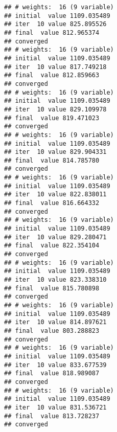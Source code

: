 \documentclass[
]{article}
\newenvironment{Shaded}{\begin{snugshade}}{\end{snugshade}}
\newcommand{\AttributeTok}[1]{\textcolor[rgb]{0.77,0.63,0.00}{#1}}
\newcommand{\CommentTok}[1]{\textcolor[rgb]{0.56,0.35,0.01}{\textit{#1}}}
\newcommand{\DecValTok}[1]{\textcolor[rgb]{0.00,0.00,0.81}{#1}}
\newcommand{\FunctionTok}[1]{\textcolor[rgb]{0.00,0.00,0.00}{#1}}
\newcommand{\NormalTok}[1]{#1}
\newcommand{\OtherTok}[1]{\textcolor[rgb]{0.56,0.35,0.01}{#1}}
\newcommand{\SpecialCharTok}[1]{\textcolor[rgb]{0.00,0.00,0.00}{#1}}
\begin{document}
\begin{Shaded}
\end{Shaded}

\begin{verbatim}
## # weights:  16 (9 variable)
## initial  value 1109.035489 
## iter  10 value 825.895526
## final  value 812.965374 
## converged
## # weights:  16 (9 variable)
## initial  value 1109.035489 
## iter  10 value 817.749218
## final  value 812.859663 
## converged
## # weights:  16 (9 variable)
## initial  value 1109.035489 
## iter  10 value 829.109978
## final  value 819.471023 
## converged
## # weights:  16 (9 variable)
## initial  value 1109.035489 
## iter  10 value 829.904331
## final  value 814.785780 
## converged
## # weights:  16 (9 variable)
## initial  value 1109.035489 
## iter  10 value 822.838011
## final  value 816.664332 
## converged
## # weights:  16 (9 variable)
## initial  value 1109.035489 
## iter  10 value 829.280471
## final  value 822.354104 
## converged
## # weights:  16 (9 variable)
## initial  value 1109.035489 
## iter  10 value 823.338310
## final  value 815.780898 
## converged
## # weights:  16 (9 variable)
## initial  value 1109.035489 
## iter  10 value 814.897621
## final  value 803.288823 
## converged
## # weights:  16 (9 variable)
## initial  value 1109.035489 
## iter  10 value 833.677539
## final  value 818.989087 
## converged
## # weights:  16 (9 variable)
## initial  value 1109.035489 
## iter  10 value 831.536721
## final  value 813.728237 
## converged
\end{verbatim}
\end{document}
